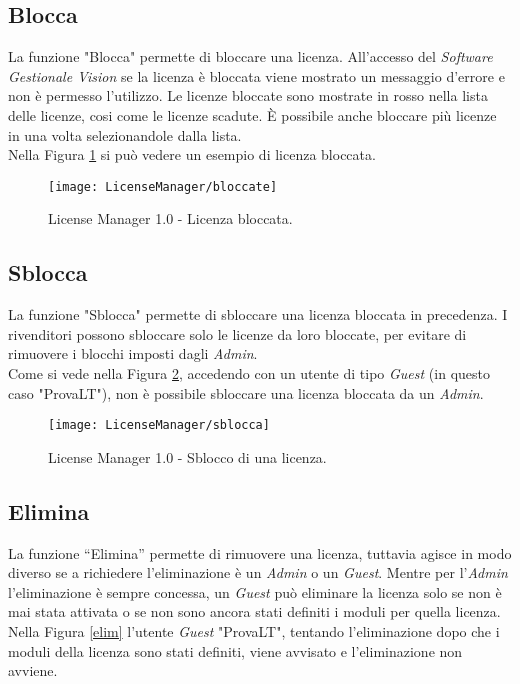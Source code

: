 \subsection{Blocca}

La funzione "Blocca" permette di bloccare una licenza. All’accesso del \textit{Software Gestionale Vision} se la licenza è bloccata viene mostrato un messaggio d’errore e non è permesso l’utilizzo.
Le licenze bloccate sono mostrate in rosso nella lista delle licenze, cosi come le licenze scadute.
È possibile anche bloccare più licenze in una volta selezionandole dalla lista.
\\
Nella Figura \ref{block} si può vedere un esempio di licenza bloccata.
\begin{figure}[!h] 
    \centering 
    \texttt{[image: LicenseManager/bloccate]} 
    \caption{License Manager 1.0 - Licenza bloccata.}
\label{block}
\end{figure}

\subsection{Sblocca}
La funzione "Sblocca" permette di sbloccare una licenza bloccata in precedenza.
I rivenditori possono sbloccare solo le licenze da loro bloccate, per evitare di rimuovere i blocchi imposti dagli \textit{Admin}.\\
Come si vede nella Figura \ref{sblocca}, accedendo con un utente di tipo \textit{Guest} (in questo caso "ProvaLT"), non è possibile sbloccare una licenza bloccata da un \textit{Admin}.

\begin{figure}[!h] 
    \centering 
    \texttt{[image: LicenseManager/sblocca]} 
    \caption{License Manager 1.0 - Sblocco di una licenza.}
\label{sblocca}
\end{figure}

\subsection{Elimina}
La funzione “Elimina” permette di rimuovere una licenza, tuttavia agisce in modo diverso se a richiedere l'eliminazione è un \textit{Admin} o un \textit{Guest}. Mentre per l’\textit{Admin} l’eliminazione è sempre concessa, un \textit{Guest} può eliminare la licenza solo se non è mai stata attivata o se non sono ancora stati definiti i moduli per quella licenza.\\
Nella Figura \ref{elim} l’utente \textit{Guest} "ProvaLT", tentando l’eliminazione dopo che i moduli della licenza sono stati definiti, viene avvisato e l’eliminazione non avviene.

